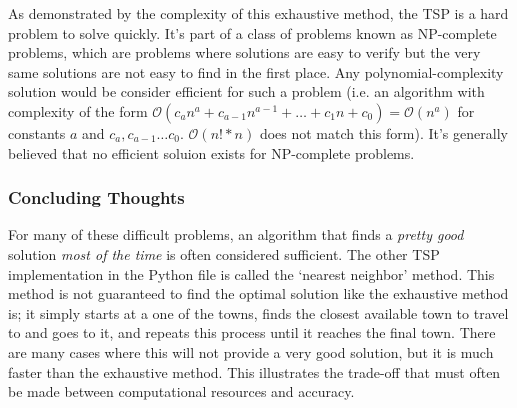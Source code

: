 \documentclass[11pt]{article}
\begin{document}
As demonstrated by the complexity of this exhaustive method, the TSP is a hard
problem to solve quickly. It's part of a class of problems known as NP-complete
problems, which are problems where solutions are easy to verify but the very
same solutions are not easy to find in the first place. Any
polynomial-complexity solution would be consider efficient for such a problem
(i.e. an algorithm with complexity of the form $\mathcal{O}(c_a n^a + c_{a-1}
n^{a-1} + \ldots + c_1 n + c_0) = \mathcal{O}(n^a)$ for constants $a$ and $c_a,
c_{a-1} \ldots c_0$. $\mathcal{O}(n! *n)$ does not match this form). It's
generally believed that no efficient soluion exists for NP-complete problems.

\subsubsection{Concluding Thoughts}
For many of these difficult problems, an algorithm that finds a \textit{pretty
good} solution \textit{most of the time} is often considered sufficient. The
other TSP implementation in the Python file is called the `nearest neighbor'
method. This method is not guaranteed to find the optimal solution like the
exhaustive method is; it simply starts at a one of the towns, finds the closest
available town to travel to and goes to it, and repeats this process until it
reaches the final town. There are many cases where this will not provide a very
good solution, but it is much faster than the exhaustive method. This
illustrates the trade-off that must often be made between computational
resources and accuracy.
\end{document}
